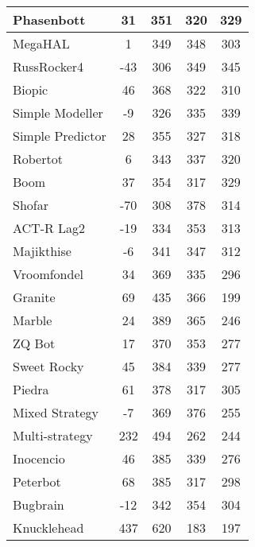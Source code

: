 \begin{table}
\begin{tabular}{|l|c|c|c|c|}
Phasenbott & 31 & 351 & 320 & 329 \\ \hline 
MegaHAL & 1 & 349 & 348 & 303 \\ \hline 
RussRocker4 & -43 & 306 & 349 & 345 \\ \hline 
Biopic & 46 & 368 & 322 & 310 \\ \hline 
Simple Modeller & -9 & 326 & 335 & 339 \\ \hline 
Simple Predictor & 28 & 355 & 327 & 318 \\ \hline 
Robertot & 6 & 343 & 337 & 320 \\ \hline 
Boom & 37 & 354 & 317 & 329 \\ \hline 
Shofar & -70 & 308 & 378 & 314 \\ \hline 
ACT-R Lag2 & -19 & 334 & 353 & 313 \\ \hline 
Majikthise & -6 & 341 & 347 & 312 \\ \hline 
Vroomfondel & 34 & 369 & 335 & 296 \\ \hline 
\rowcolor{HighlightRowColor} Granite & 69 & 435 & 366 & 199 \\ \hline 
Marble & 24 & 389 & 365 & 246 \\ \hline 
ZQ Bot & 17 & 370 & 353 & 277 \\ \hline 
Sweet Rocky & 45 & 384 & 339 & 277 \\ \hline 
\rowcolor{HighlightRowColor} Piedra & 61 & 378 & 317 & 305 \\ \hline 
Mixed Strategy & -7 & 369 & 376 & 255 \\ \hline 
\rowcolor{HighlightRowColor} Multi-strategy & 232 & 494 & 262 & 244 \\ \hline 
Inocencio & 46 & 385 & 339 & 276 \\ \hline 
\rowcolor{HighlightRowColor} Peterbot & 68 & 385 & 317 & 298 \\ \hline 
Bugbrain & -12 & 342 & 354 & 304 \\ \hline 
\rowcolor{HighlightRowColor} Knucklehead & 437 & 620 & 183 & 197 \\ \hline
        \end{tabular}
    \end{table}